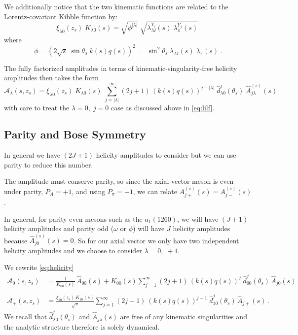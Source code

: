 \documentclass[10pt, aps,prd,amsmath,amssymb,superscriptaddress,onecolumn,
nofootinbib,showpacs,preprintnumbers]{revtex4-1}
\begin{document}
We additionally notice that the two kinematic functions are related to the Lorentz-covariant Kibble function by:
  \begin{equation}
    \xi_{\lambda0}(z_s) \; K_{\lambda0}(s) = \sqrt{\phi^{|\lambda|}} \; \sqrt{\lambda_M^{Y_i}(s) \; \lambda_\pi^{Y_f}(s)}\;
  \end{equation}
where
  \begin{equation}
    \phi = (2\sqrt{s} \; \sin \theta_s \; k(s) q(s))^2 =  \; \sin^2\theta_s \; \lambda_M(s) \; \lambda_\pi(s) \; .
  \end{equation}

The fully factorized amplitudes in terms of kinematic-singularity-free helicity amplitudes then takes the form
  \begin{equation}
    \label{eq:helicity-final}
    \mathcal{A}_\lambda(s,z_s) = \xi_{\lambda0}(z_s) \; K_{\lambda0}(s) \;  \sum_{j= |\lambda|}^\infty (2j+1) \, (k(s)q(s))^{j- |\lambda|} \; \hat{d}^j_{\lambda0}(\theta_s)  \; \hat{A}^{(s)}_{j\lambda}(s)
  \end{equation}
with care to treat the \(\lambda =0, \;  j=0\) case as discussed above in \cref{eq:lilf}.
\subsection{Parity and Bose Symmetry} \label{sec:symmetry}
In general we have \((2J+1)\) helicity amplitudes to consider but we can use parity to reduce this number.

The amplitude must conserve parity, so since the axial-vector meson is even under parity, \( P_A = +1\), and using \(P_\pi = -1\), we can relate \(A_{j+}^{(s)}(s) = A_{j-}^{(s)}(s)\).

In general, for parity even mesons such as the \(a_1(1260)\), we will have \((J +1)\) helicity amplitudes and parity odd (\(\omega \text{ or } \phi\)) will have \(J\) helicity amplitudes because \(\hat{A}^{(s)}_{j0}(s) = 0\). So for our axial vector we only have two independent helicity amplitudes and we choose to consider \(\lambda = 0,\; +1\).

We rewrite \cref{eq:helicity}
  \begin{align}
    \label{eq:model-helicity-zero}
    \mathcal{A}_0(s,z_s) &= \frac{1}{K_{00}(s)} \, \hat{A}_{00}(s) + K_{00}(s) \sum_{j = 1}^\infty (2j+1) \, (k(s)q(s))^j \; \hat{d}_{00}^j(\theta_s) \, \hat{A}_{j0}(s) \\
    \nonumber \\
    \label{eq:model-helicity-plus}
    \mathcal{A}_+(s,z_s) &=  \frac{\xi_{10}(z_s) \, K_{10}(s)}{\sqrt{s}} \sum_{j = 1}^\infty (2j+1) \ (k(s)q(s))^{j-1} \;  \hat{d}_{10}^j(\theta_s) \, \hat{A}_{j+}(s) \,.
   \end{align}
We recall that \(\hat{d}^j_{\lambda 0}(\theta_s)\) and \(\hat{A}_{j\lambda}(s)\) are free of any kinematic singularities and the analytic structure therefore is solely dynamical.
\end{document}

